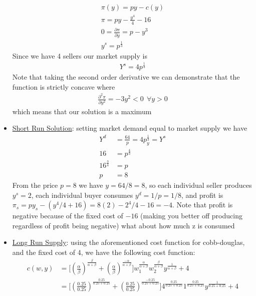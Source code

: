 \documentclass{article}
\begin{document}
\begin{itemize}
    \begin{align*}
      \pi(y) = py - c(y) \\
      \pi = py - \frac{y^{4}}{4} - 16 \\
      0 = \frac{\partial \pi}{\partial y} = p - y^{3} \\
      y^{s} = p^{\frac{1}{3}}
    \end{align*}
    Since we have 4 sellers our market supply is
    \begin{gather*}
      Y^{s} = 4p^{\tfrac{1}{3}}
    \end{gather*}
    Note that taking the second order derivative we can demonstrate that the function is strictly concave where
    \begin{gather*}
      \frac{\partial^{2} \pi}{\partial y^{2}} = -3y^{2} < 0 \ \ \forall y > 0
    \end{gather*}
    which means that our solution is a maximum
    \item  \underline{Short Run Solution}: setting market demand equal to market supply we have
    \begin{align*}
      Y^{d} &= \frac{64}{p} = 4p_{y}^{\tfrac{1}{3}} = Y^{s} \\
      16 &= p^{\tfrac{4}{3}} \\
      16^{\tfrac{3}{4}} &= p \\
      p &= 8
    \end{align*}
    From the price $p=8$ we have $y = 64/8 = 8$, so each individual seller produces $y^{s} = 2$, each individual buyer consumes $y^{d} = 1/p = 1/8$, and profit is $\pi_{s} = py_{s} - (y^{4}/4 + 16) = 8(2) - 2^{4}/4 - 16 = -4$. Note that profit is negative because of the fixed cost of $-16$ (making you better off producing regardless of profit being negative) \begingroup\color{magenta} what about how much z is consumed \endgroup
    \item  \underline{Long Run Supply}: using the aforementioned cost function for cobb-douglas, and the fixed cost of 4, we have the following cost function:
    \begin{align*}
      c(w,y) &= \big[ (\frac{\alpha}{\beta})^{\tfrac{\beta}{\alpha + \beta}} + (\frac{\alpha}{\beta})^{\tfrac{- \alpha}{\alpha + \beta}} \big] w_{1}^{\tfrac{\alpha}{\alpha + \beta}} w_{2}^{\tfrac{\beta}{\alpha + \beta}} y^{\tfrac{1}{\alpha + \beta}} + 4 \\
      &= \big[ (\frac{0.25}{0.25})^{\tfrac{0.25}{0.25 + 0.25}} + (\frac{0.25}{0.25})^{\tfrac{- 0.25}{0.25 + 0.25}} \big] 4^{\tfrac{0.25}{0.25 + 0.25}} 1^{\tfrac{0.25}{0.25 + 0.25}} y^{\tfrac{1}{0.25 + 0.25}} + 4 \\

\end{align*}
\end{itemize}
\end{document}
